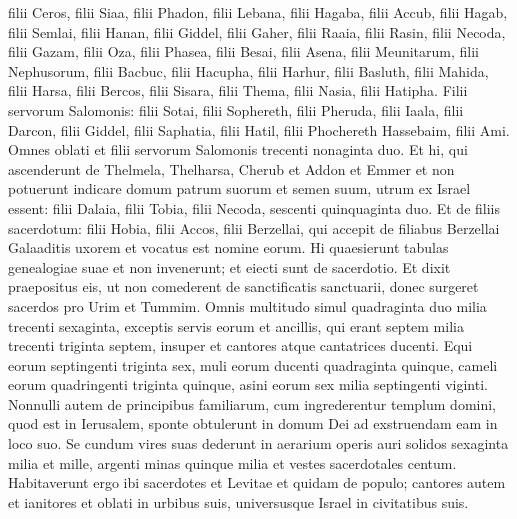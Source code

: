 \begin{biblechapter}
\begin{biblechapter}
\verse filii Ceros, filii Siaa, filii Phadon, 
\verse filii Lebana, filii Hagaba, filii Accub, 
\verse filii Hagab, filii Semlai, filii Hanan, 
\verse filii Giddel, filii Gaher, filii Raaia, 
 \verse filii Rasin, filii Necoda, filii Gazam, 
\verse filii Oza, filii Phasea, filii Besai, 
\verse filii Asena, filii Meunitarum, filii Nephusorum, 
\verse filii Bacbuc, filii Hacupha, filii Harhur, 
\verse filii Basluth, filii Mahida, filii Harsa, 
\verse filii Bercos, filii Sisara, filii Thema, 
\verse filii Nasia, filii Hatipha.
 \verse Filii servorum Salomonis: filii Sotai, filii Sophereth, filii Pheruda, 
\verse filii Iaala, filii Darcon, filii Giddel, 
\verse filii Saphatia, filii Hatil, filii Phochereth Hassebaim, filii Ami.
 \verse Omnes oblati et filii servorum Salomonis trecenti nonaginta duo.
 \verse Et hi, qui ascenderunt de Thelmela, Thelharsa, Cherub et Addon et Emmer et non potuerunt indicare domum patrum suorum et semen suum, utrum ex Israel essent: 
\verse filii Dalaia, filii Tobia, filii Necoda, sescenti quinquaginta duo. 
\verse Et de filiis sacerdotum: filii Hobia, filii Accos, filii Berzellai, qui accepit de filiabus Berzellai Galaaditis uxorem et vocatus est nomine eorum. 
 \verse Hi quaesierunt tabulas genealogiae suae et non invenerunt; et eiecti sunt de sacerdotio. 
\verse Et dixit praepositus eis, ut non comederent de sanctificatis sanctuarii, donec surgeret sacerdos pro Urim et Tummim.
 \verse Omnis multitudo simul quadraginta duo milia trecenti sexaginta, 
\verse exceptis servis eorum et ancillis, qui erant septem milia trecenti triginta septem, insuper et cantores atque cantatrices ducenti. 
\verse Equi eorum septingenti triginta sex, muli eorum ducenti quadraginta quinque, 
\verse cameli eorum quadringenti triginta quinque, asini eorum sex milia septingenti viginti.
 \verse Nonnulli autem de principibus familiarum, cum ingrederentur templum domini, quod est in Ierusalem, sponte obtulerunt in domum Dei ad exstruendam eam in loco suo. 
\verse Se cundum vires suas dederunt in aerarium operis auri solidos sexaginta milia et mille, argenti minas quinque milia et vestes sacerdotales centum. 
\verse Habitaverunt ergo ibi sacerdotes et Levitae et quidam de populo; cantores autem et ianitores et oblati in urbibus suis, universusque Israel in civitatibus suis.
 

\end{biblechapter}
\end{biblechapter}
